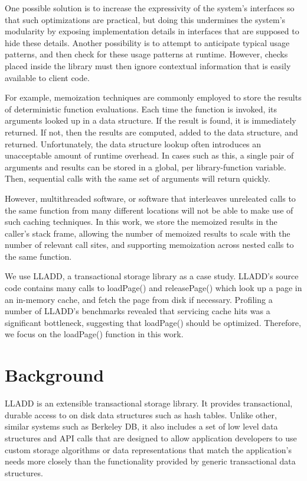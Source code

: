 \documentclass[10pt,letterpaper,twocolumn,english]{article}
\newcommand{\yad}{LLADD\xspace}
\newcommand{\pin}{loadPage()\xspace}
\newcommand{\unpin}{releasePage()\xspace}
\begin{document}
One possible solution is to increase the expressivity of the system's
interfaces so that such optimizations are practical, but doing this
undermines the system's modularity by exposing implementation details
in interfaces that are supposed to hide these details.  Another
possibility is to attempt to anticipate typical usage patterns, and
then check for these usage patterns at runtime.  However, checks
placed inside the library must then ignore contextual information that
is easily available to client code.

For example, memoization techniques are commonly employed to store the
results of deterministic function evaluations.  Each time the function
is invoked, its arguments looked up in a data structure.  If the
result is found, it is immediately returned.  If not, then the results
are computed, added to the data structure, and returned.
Unfortunately, the data structure lookup often introduces an
unacceptable amount of runtime overhead.  In cases such as this, a
single pair of arguments and results can be stored in a global, per
library-function variable.  Then, sequential calls with the same set
of arguments will return quickly.  

However, multithreaded software, or software that interleaves
unreleated calls to the same function from many different locations
will not be able to make use of such caching techniques.  In this
work, we store the memoized results in the caller's stack frame,
allowing the number of memoized results to scale with the number of
relevant call sites, and supporting memoization across nested calls to
the same function.

We use \yad, a transactional storage library as a case study.  \yad's
source code contains many calls to \pin and \unpin which look up a
page in an in-memory cache, and fetch the page from disk if necessary.
Profiling a number of \yad's benchmarks revealed that servicing cache
hits was a significant bottleneck, suggesting that \pin should be
optimized.  Therefore, we focus on the \pin function in this work.

\section{Background}
\label {prior}


\yad is an extensible transactional storage library.  It provides
transactional, durable access to on disk data structures such as hash
tables.  Unlike other, similar systems such as Berkeley DB, it also
includes a set of low level data structures and API calls that are
designed to allow application developers to use custom storage
algorithms or data representations that match the application's needs
more closely than the functionality provided by generic transactional
data structures.  
\end{document}
